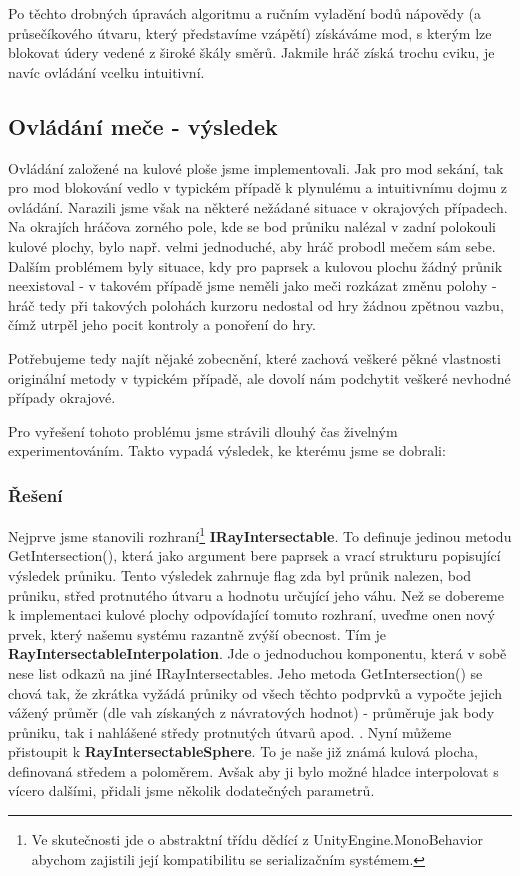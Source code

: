 \bigbreak

Po těchto drobných úpravách algoritmu a ručním vyladění bodů nápovědy (a průsečíkového útvaru, který představíme vzápětí) získáváme mod, s kterým lze blokovat údery vedené z široké škály směrů. Jakmile hráč získá trochu cviku, je navíc ovládání vcelku intuitivní.

\subsection{Ovládání meče - výsledek}

Ovládání založené na kulové ploše jsme implementovali. Jak pro mod sekání, tak pro mod blokování vedlo v typickém případě k plynulému a intuitivnímu dojmu z ovládání. Narazili jsme však na některé nežádané situace v okrajových případech. Na okrajích hráčova zorného pole, kde se bod průniku nalézal v zadní polokouli kulové plochy, bylo např. velmi jednoduché, aby hráč probodl mečem sám sebe. Dalším problémem byly situace, kdy pro paprsek a kulovou plochu žádný průnik neexistoval - v takovém případě jsme neměli jako meči rozkázat změnu polohy - hráč tedy při takových polohách kurzoru nedostal od hry žádnou zpětnou vazbu, čímž utrpěl jeho pocit kontroly a ponoření do hry.

Potřebujeme tedy najít nějaké zobecnění, které zachová veškeré pěkné vlastnosti originální metody v typickém případě, ale dovolí nám podchytit veškeré nevhodné případy okrajové.

Pro vyřešení tohoto problému jsme strávili dlouhý čas živelným experimentováním. Takto vypadá výsledek, ke kterému jsme se dobrali:

\subsubsection*{Řešení} \label{resultSwordControlsSolutionSubsubsection}

Nejprve jsme stanovili rozhraní\footnote{Ve skutečnosti jde o abstraktní třídu dědící z UnityEngine.MonoBehavior abychom zajistili její kompatibilitu se serializačním systémem.} \textbf{IRayIntersectable}. To definuje jedinou metodu GetIntersection(), která jako argument bere paprsek a vrací strukturu popisující výsledek průniku. Tento výsledek zahrnuje flag zda byl průnik nalezen, bod průniku, střed protnutého útvaru a hodnotu určující jeho váhu.
\bigbreak
Než se dobereme k implementaci kulové plochy odpovídající tomuto rozhraní, uveďme onen nový prvek, který našemu systému razantně zvýší obecnost. Tím je \textbf{RayIntersectableInterpolation}. Jde o jednoduchou komponentu, která v sobě nese list odkazů na jiné IRayIntersectables. Jeho metoda GetIntersection() se chová tak, že zkrátka vyžádá průniky od všech těchto podprvků a vypočte jejich vážený průměr (dle vah získaných z návratových hodnot) - průměruje jak body průniku, tak i nahlášené středy protnutých útvarů apod. .
\bigbreak
Nyní můžeme přistoupit k \textbf{RayIntersectableSphere}. To je naše již známá kulová plocha, definovaná středem a poloměrem. Avšak aby ji bylo možné hladce interpolovat s vícero dalšími, přidali jsme několik dodatečných parametrů.

